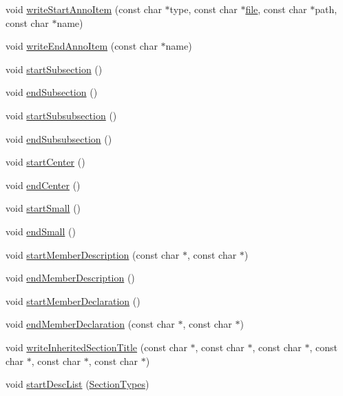 \begin{DoxyCompactItemize}
\item 
void \hyperlink{class_latex_generator_a21b7b03364f200aa447b2a403aaa8fd8}{write\+Start\+Anno\+Item} (const char $\ast$type, const char $\ast$\hyperlink{class_output_generator_aed5ad11c3844cdf71ec6fee6c1c84286}{file}, const char $\ast$path, const char $\ast$name)
\item 
void \hyperlink{class_latex_generator_a693962a41191433fd5ded47259149358}{write\+End\+Anno\+Item} (const char $\ast$name)
\item 
void \hyperlink{class_latex_generator_a39d4b6c5ce49e1a2cef9d6046e78ef92}{start\+Subsection} ()
\item 
void \hyperlink{class_latex_generator_a076423c36308d68eaa4ae934909960ea}{end\+Subsection} ()
\item 
void \hyperlink{class_latex_generator_a845056c8248cf0662d95aa4b584fe561}{start\+Subsubsection} ()
\item 
void \hyperlink{class_latex_generator_a4eb7f9f80bf4407d5b23c1b13d0a560b}{end\+Subsubsection} ()
\item 
void \hyperlink{class_latex_generator_a9ee4283738dc975f9b31b554a0de945e}{start\+Center} ()
\item 
void \hyperlink{class_latex_generator_a8c5c4da427d30d6ef2756c036e0e88d1}{end\+Center} ()
\item 
void \hyperlink{class_latex_generator_a1b522f2da59b6ee8f3ac0d10478ea9bd}{start\+Small} ()
\item 
void \hyperlink{class_latex_generator_aa0f89ab599109d222204ed70531feb84}{end\+Small} ()
\item 
void \hyperlink{class_latex_generator_a287b481674a16a94961ad4e54f8fbb98}{start\+Member\+Description} (const char $\ast$, const char $\ast$)
\item 
void \hyperlink{class_latex_generator_ac73e2b21e08541913b49077b57772b81}{end\+Member\+Description} ()
\item 
void \hyperlink{class_latex_generator_a960022ab73b0ed3a206ab0213a441ecf}{start\+Member\+Declaration} ()
\item 
void \hyperlink{class_latex_generator_aef5e24c5148ee8bbd44f3714d7245222}{end\+Member\+Declaration} (const char $\ast$, const char $\ast$)
\item 
void \hyperlink{class_latex_generator_ab220991e00f47ee214d913afb0dcde0e}{write\+Inherited\+Section\+Title} (const char $\ast$, const char $\ast$, const char $\ast$, const char $\ast$, const char $\ast$, const char $\ast$)
\item 
void \hyperlink{class_latex_generator_a00a3cac1ee031131ea910dc3c166b99f}{start\+Desc\+List} (\hyperlink{class_base_output_doc_interface_a07a3d5df76a714674e070e5e236fe886}{Section\+Types})

\end{DoxyCompactItemize}
